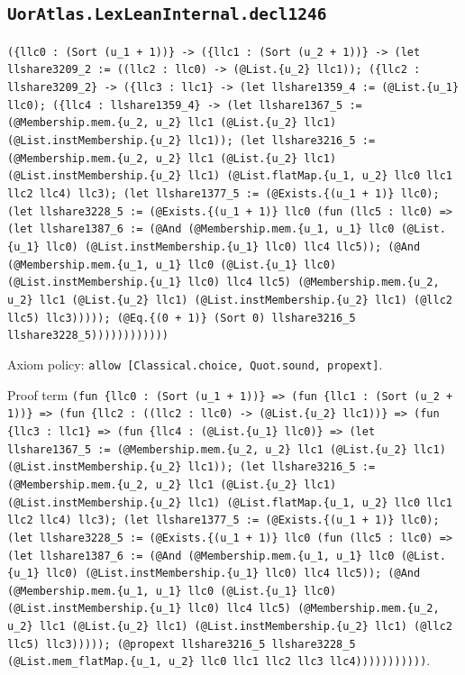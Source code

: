 \documentclass[11pt]{article}
\begin{document}
\subsection*{\texttt{UorAtlas.LexLeanInternal.decl1246}}
\noindent\texttt{(\{llc0 : (Sort (u\_1 + 1))\} -> (\{llc1 : (Sort (u\_2 + 1))\} -> (let llshare3209\_2 := ((llc2 : llc0) -> (@List.\{u\_2\} llc1)); (\{llc2 : llshare3209\_2\} -> (\{llc3 : llc1\} -> (let llshare1359\_4 := (@List.\{u\_1\} llc0); (\{llc4 : llshare1359\_4\} -> (let llshare1367\_5 := (@Membership.mem.\{u\_2, u\_2\} llc1 (@List.\{u\_2\} llc1) (@List.instMembership.\{u\_2\} llc1)); (let llshare3216\_5 := (@Membership.mem.\{u\_2, u\_2\} llc1 (@List.\{u\_2\} llc1) (@List.instMembership.\{u\_2\} llc1) (@List.flatMap.\{u\_1, u\_2\} llc0 llc1 llc2 llc4) llc3); (let llshare1377\_5 := (@Exists.\{(u\_1 + 1)\} llc0); (let llshare3228\_5 := (@Exists.\{(u\_1 + 1)\} llc0 (fun (llc5 : llc0) => (let llshare1387\_6 := (@And (@Membership.mem.\{u\_1, u\_1\} llc0 (@List.\{u\_1\} llc0) (@List.instMembership.\{u\_1\} llc0) llc4 llc5)); (@And (@Membership.mem.\{u\_1, u\_1\} llc0 (@List.\{u\_1\} llc0) (@List.instMembership.\{u\_1\} llc0) llc4 llc5) (@Membership.mem.\{u\_2, u\_2\} llc1 (@List.\{u\_2\} llc1) (@List.instMembership.\{u\_2\} llc1) (@llc2 llc5) llc3))))); (@Eq.\{(0 + 1)\} (Sort 0) llshare3216\_5 llshare3228\_5))))))))))))}\par
\noindent Axiom policy: \texttt{allow [Classical.choice, Quot.sound, propext]}.\par
\noindent Proof term \texttt{(fun \{llc0 : (Sort (u\_1 + 1))\} => (fun \{llc1 : (Sort (u\_2 + 1))\} => (fun \{llc2 : ((llc2 : llc0) -> (@List.\{u\_2\} llc1))\} => (fun \{llc3 : llc1\} => (fun \{llc4 : (@List.\{u\_1\} llc0)\} => (let llshare1367\_5 := (@Membership.mem.\{u\_2, u\_2\} llc1 (@List.\{u\_2\} llc1) (@List.instMembership.\{u\_2\} llc1)); (let llshare3216\_5 := (@Membership.mem.\{u\_2, u\_2\} llc1 (@List.\{u\_2\} llc1) (@List.instMembership.\{u\_2\} llc1) (@List.flatMap.\{u\_1, u\_2\} llc0 llc1 llc2 llc4) llc3); (let llshare1377\_5 := (@Exists.\{(u\_1 + 1)\} llc0); (let llshare3228\_5 := (@Exists.\{(u\_1 + 1)\} llc0 (fun (llc5 : llc0) => (let llshare1387\_6 := (@And (@Membership.mem.\{u\_1, u\_1\} llc0 (@List.\{u\_1\} llc0) (@List.instMembership.\{u\_1\} llc0) llc4 llc5)); (@And (@Membership.mem.\{u\_1, u\_1\} llc0 (@List.\{u\_1\} llc0) (@List.instMembership.\{u\_1\} llc0) llc4 llc5) (@Membership.mem.\{u\_2, u\_2\} llc1 (@List.\{u\_2\} llc1) (@List.instMembership.\{u\_2\} llc1) (@llc2 llc5) llc3))))); (@propext llshare3216\_5 llshare3228\_5 (@List.mem\_flatMap.\{u\_1, u\_2\} llc0 llc1 llc2 llc3 llc4)))))))))))}.\par
\end{document}

